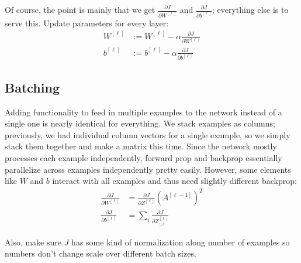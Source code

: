 \documentclass[12pt]{article}
\begin{document}
\begin{outline}
Of course, the point is mainly that we get $\displaystyle \frac{\partial J}{\partial W^{[\ell]}}$ and $\displaystyle \frac{\partial J}{\partial b^{[\ell]}}$; everything else is to serve this. Update parameters for every layer:
\begin{align*}
    W^{[\ell]} &:= W^{[\ell]} - \alpha \frac{\partial J}{\partial W^{[\ell]}} \\
    b^{[\ell]} &:= b^{[\ell]} - \alpha \frac{\partial J}{\partial b^{[\ell]}}
\end{align*}

\subsection{Batching}

Adding functionality to feed in multiple examples to the network instead of a single one is nearly identical for everything. We stack examples as columns; previously, we had individual column vectors for a single example, so we simply stack them together and make a matrix this time. Since the network mostly processes each example independently, forward prop and backprop essentially parallelize across examples independently pretty easily. However, some elements like $W$ and $b$ interact with all examples and thus need slightly different backprop:
\begin{align*}
    \frac{\partial J}{\partial W^{[\ell]}} &= \frac{\partial J}{\partial Z^{[\ell]}} \left(A^{[\ell-1]}\right)^T \\
    \frac{\partial J}{\partial b^{[\ell]}} &= \sum_i \frac{\partial J}{\partial Z^{[\ell]}_{:,i}}
\end{align*}

Also, make sure $J$ has some kind of normalization along number of examples so numbers don't change scale over different batch sizes.

\end{outline}
\end{document}

